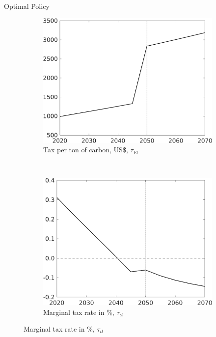 \documentclass[11pt,aspectratio=169]{beamer}
\begin{document}
\begin{frame}{Optimal Policy}
\vspace{-3mm}
\begin{figure}[h!!]
	
	\begin{subfigure}{0.4\textwidth}		
		\caption{Tax per ton of carbon,  US\$, $\tau_{Ft}$}
		\includegraphics[width=1\textwidth]{../codding_model/own_basedOnFried/optimalPol_010922_revision/figures/all_13Sept22_Tplus30/Single_periods12_OPT_T_NoTaus_Tauf_regime4_spillover0_knspil0_noskill0_sep0_xgrowth0_extern0_PV1_sizeequ0_GOV0_etaa0.79.png}
	\end{subfigure}	
	\begin{minipage}[]{0.1\textwidth}
		\ 
	\end{minipage}
	\begin{subfigure}{0.4\textwidth}		
		\caption{Marginal tax rate in \%, $\tau_{\iota t}$}
		\includegraphics[width=1\textwidth]{../codding_model/own_basedOnFried/optimalPol_010922_revision/figures/all_13Sept22_Tplus30/dTaulAv_OPT_T_NoTaus_COMPtaul_regime4_spillover0_knspil0_noskill0_sep0_xgrowth0_PV1_etaa0.79_lgd0.png}

\end{subfigure}
\end{figure}
\end{frame}
\end{document}
